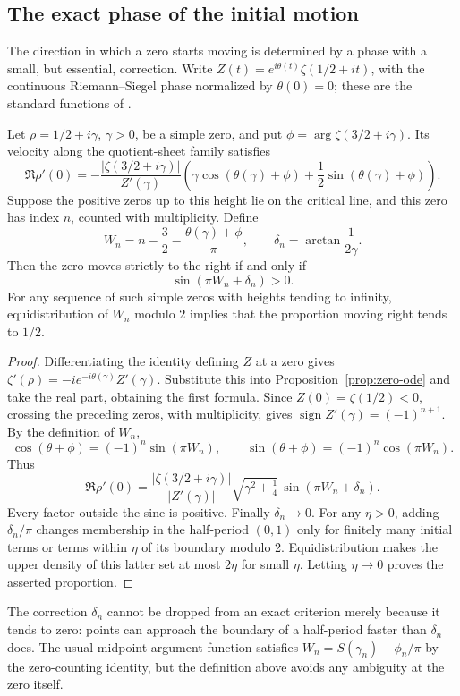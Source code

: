 \subsection{The exact phase of the initial motion}
The direction in which a zero starts moving is determined by a phase with a small, but essential, correction.
Write $Z(t)=e^{i\theta(t)}\zeta(1/2+it)$, with the continuous Riemann--Siegel phase normalized by $\theta(0)=0$; these are the standard functions of \citet[\S25.10(i), equations 25.10.1--2]{DLMFZeros}.

\begin{proposition}\label{prop:zero-phase}
Let $\rho=1/2+i\gamma$, $\gamma>0$, be a simple zero, and put
$\phi=\arg\zeta(3/2+i\gamma)$. Its velocity along the quotient-sheet family satisfies
\[
 \Re\rho'(0)=-\frac{|\zeta(3/2+i\gamma)|}{Z'(\gamma)}
 \left(\gamma\cos(\theta(\gamma)+\phi)
       +\frac12\sin(\theta(\gamma)+\phi)\right).
\]
Suppose the positive zeros up to this height lie on the critical line, and this zero has index $n$, counted with multiplicity. Define
\[
 W_n=n-\frac32-\frac{\theta(\gamma)+\phi}{\pi},
 \qquad \delta_n=\arctan\frac1{2\gamma}.
\]
Then the zero moves strictly to the right if and only if
\[
 \sin(\pi W_n+\delta_n)>0.
\]
For any sequence of such simple zeros with heights tending to infinity, equidistribution of $W_n$ modulo $2$ implies that the proportion moving right tends to $1/2$.
\end{proposition}
\begin{proof}
Differentiating the identity defining $Z$ at a zero gives
$\zeta'(\rho)=-i e^{-i\theta(\gamma)}Z'(\gamma)$.
Substitute this into Proposition~\ref{prop:zero-ode} and take the real part, obtaining the first formula.
Since $Z(0)=\zeta(1/2)<0$, crossing the preceding zeros, with multiplicity, gives
$\operatorname{sign}Z'(\gamma)=(-1)^{n+1}$. By the definition of $W_n$,
\[
 \cos(\theta+\phi)=(-1)^n\sin(\pi W_n),\qquad
 \sin(\theta+\phi)=(-1)^n\cos(\pi W_n).
\]
Thus
\[
 \Re\rho'(0)=\frac{|\zeta(3/2+i\gamma)|}{|Z'(\gamma)|}
 \sqrt{\gamma^2+\tfrac14}\,
 \sin(\pi W_n+\delta_n).
\]
Every factor outside the sine is positive. Finally $\delta_n\to0$. For any $\eta>0$, adding $\delta_n/\pi$ changes membership in the half-period $(0,1)$ only for finitely many initial terms or terms within $\eta$ of its boundary modulo 2. Equidistribution makes the upper density of this latter set at most $2\eta$ for small $\eta$. Letting $\eta\to0$ proves the asserted proportion.
\end{proof}

The correction $\delta_n$ cannot be dropped from an exact criterion merely because it tends to zero: points can approach the boundary of a half-period faster than $\delta_n$ does. The usual midpoint argument function satisfies $W_n=S(\gamma_n)-\phi_n/\pi$ by the zero-counting identity, but the definition above avoids any ambiguity at the zero itself.


